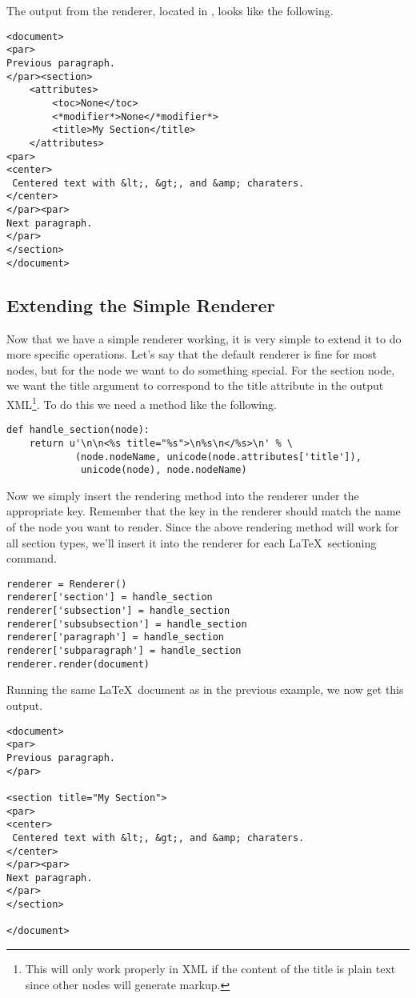 The output from the renderer, located in , looks like the
following.
\begin{verbatim}
<document>
<par>
Previous paragraph.
</par><section>
    <attributes>
        <toc>None</toc>
        <*modifier*>None</*modifier*>
        <title>My Section</title>
    </attributes>
<par>
<center>
 Centered text with &lt;, &gt;, and &amp; charaters.
</center>
</par><par>
Next paragraph.
</par>
</section>
</document>
\end{verbatim}


\subsection{Extending the Simple Renderer}

Now that we have a simple renderer working, it is very simple to extend
it to do more specific operations.  Let's say that the default renderer
is fine for most nodes, but for the  node we want to do
something special.  For the section node, we want the title argument
to correspond to the title attribute in the output XML\footnote{This
will only work properly in XML if the content of the title is plain text
since other nodes will generate markup.}.  To do this we need a
method like the following.
\begin{verbatim}
def handle_section(node):
    return u'\n\n<%s title="%s">\n%s\n</%s>\n' % \
            (node.nodeName, unicode(node.attributes['title']),
             unicode(node), node.nodeName)
\end{verbatim}

Now we simply insert the rendering method into the renderer under the
appropriate key.  Remember that the key in the renderer should match
the name of the node you want to render.  Since the above rendering
method will work for all section types, we'll insert it into the
renderer for each \LaTeX\ sectioning command.
\begin{verbatim}
renderer = Renderer()
renderer['section'] = handle_section
renderer['subsection'] = handle_section
renderer['subsubsection'] = handle_section
renderer['paragraph'] = handle_section
renderer['subparagraph'] = handle_section
renderer.render(document)
\end{verbatim}

Running the same \LaTeX\ document as in the previous example, we now get
this output.
\begin{verbatim}
<document>
<par>
Previous paragraph.
</par>

<section title="My Section">
<par>
<center>
 Centered text with &lt;, &gt;, and &amp; charaters.
</center>
</par><par>
Next paragraph.
</par>
</section>

</document>
\end{verbatim}

